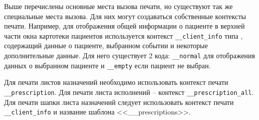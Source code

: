 Выше перечислены основные места вызова печати, но существуют так же специальные места вызова. Для них могут создаваться собственные контексты печати. Например, для отображения общей информации о пациенте в верхней части окна картотеки пациентов используется контекст \verb|__client_info| типа , содержащий данные о пациенте, выбранном событии и некоторые дополнительные данные. Для него существует 2 кода: \verb|__normal| для отображения данных о выбранном пациенте и \verb|__empty| если пациент не выбран.

Для печати листов назначений необходимо использовать контекст печати \verb|__prescription|. Для печати листа исполнений -- контекст  \verb|__prescription_all|. Для печати шапки листа назначений следует использовать контекст печати \verb|__client_info| и название шаблона <<\_\_prescriptions>>.

